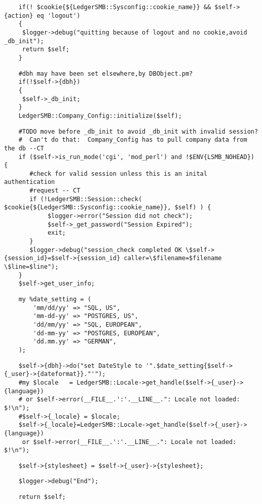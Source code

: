 \begin{verbatim}
    if(! $cookie{${LedgerSMB::Sysconfig::cookie_name}} && $self->{action} eq 'logout')
    {
     $logger->debug("quitting because of logout and no cookie,avoid _db_init");
     return $self;
    }
\end{verbatim}
\begin{verbatim}
    #dbh may have been set elsewhere,by DBObject.pm?
    if(!$self->{dbh})
    {
     $self->_db_init;
    }
    LedgerSMB::Company_Config::initialize($self);
\end{verbatim}
\begin{verbatim}
    #TODO move before _db_init to avoid _db_init with invalid session?
    #  Can't do that:  Company_Config has to pull company data from the db --CT
    if ($self->is_run_mode('cgi', 'mod_perl') and !$ENV{LSMB_NOHEAD}) {
       #check for valid session unless this is an inital authentication
       #request -- CT
       if (!LedgerSMB::Session::check( $cookie{${LedgerSMB::Sysconfig::cookie_name}}, $self) ) {
            $logger->error("Session did not check");
            $self->_get_password("Session Expired");
            exit;
       }
       $logger->debug("session_check completed OK \$self->{session_id}=$self->{session_id} caller=\$filename=$filename \$line=$line");
    }
    $self->get_user_info;
\end{verbatim}
\begin{verbatim}
    my %date_setting = (
        'mm/dd/yy' => "SQL, US",
        'mm-dd-yy' => "POSTGRES, US",
        'dd/mm/yy' => "SQL, EUROPEAN",
        'dd-mm-yy' => "POSTGRES, EUROPEAN",
        'dd.mm.yy' => "GERMAN",
    );
\end{verbatim}
\begin{verbatim}
    $self->{dbh}->do("set DateStyle to '".$date_setting{$self->{_user}->{dateformat}}."'");
    #my $locale   = LedgerSMB::Locale->get_handle($self->{_user}->{language})
    # or $self->error(__FILE__.':'.__LINE__.": Locale not loaded: $!\n");
    #$self->{_locale} = $locale;
    $self->{_locale}=LedgerSMB::Locale->get_handle($self->{_user}->{language})
     or $self->error(__FILE__.':'.__LINE__.": Locale not loaded: $!\n");
\end{verbatim}
\begin{verbatim}
    $self->{stylesheet} = $self->{_user}->{stylesheet};
\end{verbatim}
\begin{verbatim}
    $logger->debug("End");
\end{verbatim}
\begin{verbatim}
    return $self;
\end{verbatim}


